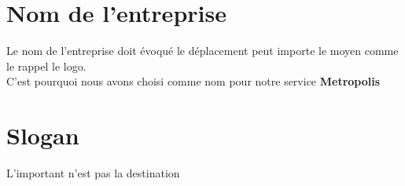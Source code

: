 \documentclass[a4paper,12pt]{article}
\begin{document}
\section{Nom de l'entreprise}
Le nom de l'entreprise doit évoqué le déplacement peut importe le moyen comme le rappel le logo.\\
C'est pourquoi nous avons choisi comme nom pour notre service \textbf{Metropolis}

\section{Slogan}
L'important n'est pas la destination
\end{document}
